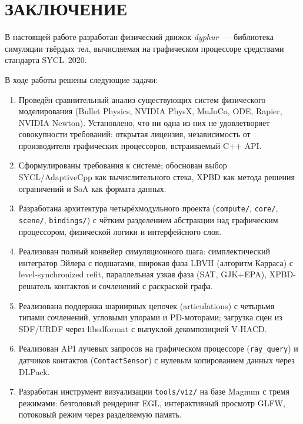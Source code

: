 \chapter*{ЗАКЛЮЧЕНИЕ}

В настоящей работе разработан физический движок \textit{dyphur}~--- библиотека симуляции твёрдых тел, 
вычисляемая на графическом процессоре средствами стандарта SYCL~2020.

В ходе работы решены следующие задачи:

\begin{enumerate}
  \item Проведён сравнительный анализ существующих систем физического моделирования
    (Bullet Physics, NVIDIA PhysX, MuJoCo, ODE, Rapier, NVIDIA Newton).
    Установлено, что ни одна из них не удовлетворяет совокупности требований:
    открытая лицензия, независимость от производителя графических процессоров, встраиваемый C++ API.

  \item Сформулированы требования к системе; обоснован выбор SYCL/AdaptiveCpp
    как вычислительного стека, XPBD как метода решения ограничений и SoA как формата данных.

  \item Разработана архитектура четырёхмодульного проекта (\texttt{compute/},
    \texttt{core/}, \texttt{scene/}, \texttt{bindings/}) с чётким разделением
    абстракции над графическим процессором, физической логики и интерфейсного слоя.

  \item Реализован полный конвейер симуляционного шага:
    симплектический интегратор Эйлера с подшагами,
    широкая фаза LBVH (алгоритм Карраса) с level-synchronized refit,
    параллельная узкая фаза (SAT, GJK+EPA),
    XPBD-решатель контактов и сочленений с раскраской графа.

  \item Реализована поддержка шарнирных цепочек (articulations)
    с четырьмя типами сочленений, угловыми упорами и PD-моторами;
    загрузка сцен из SDF/URDF через libsdformat с выпуклой декомпозицией V-HACD.

  \item Реализован API лучевых запросов на графическом процессоре (\texttt{ray\_query})
    и датчиков контактов (\texttt{ContactSensor}) с нулевым копированием
    данных через DLPack.

  \item Разработан инструмент визуализации \texttt{tools/viz/} на базе Magnum
    с тремя режимами: безголовый рендеринг EGL, интерактивный просмотр GLFW,
    потоковый режим через разделяемую память.


\end{enumerate}
